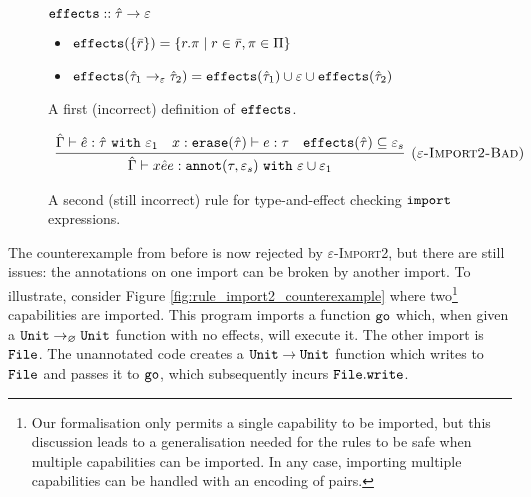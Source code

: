 \begin{figure}[h]

$\mathtt{effects} :: \hat \tau \rightarrow \varepsilon$
\begin{itemize}
	\setlength\itemsep{-0.2em}
	\item[] $\mathtt{effects}(\{ \bar r \}) = \{ r.\pi \mid r \in \bar r, \pi \in \Pi \}$
	\item[] $\mathtt{effects}(\hat \tau_1 \rightarrow_{\varepsilon} \hat \tau_2) = \mathtt{effects}(\hat \tau_1) \cup \varepsilon \cup \mathtt{effects}(\hat \tau_2)$
\end{itemize}
\vspace{-7pt}
\caption{A first (incorrect) definition of $\mathtt{effects}$.}
\label{fig:fx_defn}
\end{figure}

\begin{figure}[h]

\[
\begin{array}{c}

\infer[\textsc{($\varepsilon$-Import2-Bad)}]
	{ \hat \Gamma \vdash {x}{\hat e}{e}: \kwa{annot}(\tau, \varepsilon_s)~\kw{with} \varepsilon \cup \varepsilon_1 }
	{ \hat \Gamma \vdash \hat e: \hat \tau~\kw{with} \varepsilon_1 & x: \kwa{erase}(\hat \tau) \vdash e: \tau & \kwa{effects}(\hat \tau) \subseteq \varepsilon_s}

\end{array}
\]
\vspace{-7pt}
\caption{A second (still incorrect) rule for type-and-effect checking $\mathtt{import}$ expressions.}
\label{fig:import_rule_2}
\end{figure}

The counterexample from before is now rejected by
\textsc{$\varepsilon$-Import2}, but there are still issues: the
annotations on one import can be broken by another import. To
illustrate, consider Figure \ref{fig:rule_import2_counterexample}
where two\footnote{Our formalisation only permits a single capability
  to be imported, but this discussion leads to a generalisation needed
  for the rules to be safe when multiple capabilities can be imported.
  In any case, importing multiple capabilities can be handled with an
  encoding of pairs.} capabilities are imported. This program imports
a function $\mathtt{go}$ which, when given a
$\mathtt{Unit} \rightarrow_{\varnothing} \mathtt{Unit}$ function with no effects, will
execute it. The other import is $\mathtt{File}$. The unannotated code
creates a $\mathtt{Unit} \rightarrow \mathtt{Unit}$ function which writes to
$\mathtt{File}$ and passes it to $\mathtt{go}$, which subsequently incurs
$\mathtt{File.write}$.

